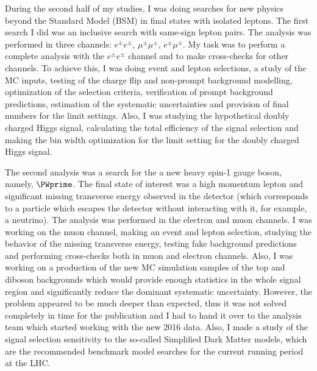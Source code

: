 \begin{preface}
During the second half of my studies, I was doing searches for new physics beyond the Standard Model (BSM) in final states with isolated leptons. The first search I did was an inclusive search with same-sign lepton pairs. The analysis was performed in three channels: $e^{\pm}e^{\pm}$, $\mu^{\pm}\mu^{\pm}$, $e^{\pm}\mu^{\pm}$. My task was to perform a complete analysis with the $e^{\pm}e^{\pm}$ channel and to make cross-checks for other channels. To achieve this, I was doing event and lepton selections, a study of the MC inputs, testing of the charge flip and non-prompt background modelling, optimization of the selection criteria, verification of prompt background predictions, estimation of the systematic uncertainties and provision of final numbers for the limit settings. Also, I was studying the hypothetical doubly charged Higgs signal, calculating the total efficiency of the signal selection and making the bin width optimization for the limit setting for the doubly charged Higgs signal.

The second analysis was a search for the a new heavy spin-1 gauge boson, namely, $\PWprime$. The final state of interest was a high momentum lepton and significant missing transverse energy observed in the detector (which corresponds to a particle which escapes the detector without interacting with it, for example, a neutrino). The analysis was performed in the electron and muon channels.
I was working on the muon channel, making an event and lepton selection, studying the behavior of the missing transverse energy, testing fake background predictions and performing cross-checks both in muon and electron channels. Also, I was working on a production of the new MC simulation samples of the top and diboson backgrounds which would provide enough statistics in the whole signal region and significantly reduce the dominant systematic uncertainty. However, the problem appeared to be much deeper than expected, thus it was not solved completely in time for the publication and I had to hand it over to the analysis team which started working with the new 2016 data.
Also, I made a study of the signal selection sensitivity to the so-called Simplified Dark Matter models, which are the recommended 
benchmark model searches for the current running period at the LHC.


\end{preface}
